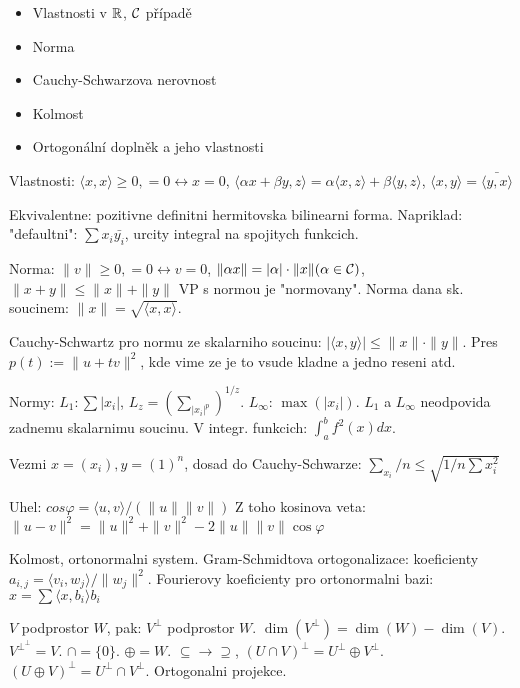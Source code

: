\begin{itemize}
\item Vlastnosti v $\mathbb{R}$, $\mathcal{C}$ případě
\item Norma
\item Cauchy-Schwarzova nerovnost
\item Kolmost
\item Ortogonální doplněk a jeho vlastnosti
\end{itemize}

Vlastnosti: $\langle x,x\rangle\geq 0, =0\leftrightarrow x=0$,
$\langle\alpha x+\beta y,z\rangle=\alpha\langle x,z\rangle+\beta\langle
y,z\rangle$, $\langle x,y\rangle=\bar{\langle y,x\rangle}$

Ekvivalentne: pozitivne definitni hermitovska bilinearni forma.
Napriklad: "defaultni": $\sum x_i\bar{y_i}$, urcity integral na spojitych
funkcich.

Norma: $\|v\|\geq 0,=0\leftrightarrow v=0$, $\|\alpha x\|=|\alpha|\cdot\|x\|
(\alpha\in\mathcal{C})$, $\|x+y\|\leq\|x\|+\|y\|$
VP s normou je "normovany".
Norma dana sk. soucinem: $\|x\|=\sqrt{\langle x,x\rangle}$.

Cauchy-Schwartz pro normu ze skalarniho soucinu:
$|\langle x,y\rangle|\leq\|x\|\cdot\|y\|$.
Pres $p(t):=\|u+tv\|^2$, kde vime ze je to vsude kladne a jedno reseni atd.

Normy: $L_1: \sum|x_i|$, $L_z=(\sum_{|x_i|^p})^{1/z}$.
$L_\infty$: $\max(|x_i|)$. $L_1$ a $L_\infty$ neodpovida
zadnemu skalarnimu soucinu. V integr. funkcich: $\int_a^b f^2(x)dx$.

Vezmi $x=(x_i), y=(1)^n$, dosad do Cauchy-Schwarze: $\sum_{x_i}/n\leq\sqrt{1/n
\sum x_i^2}$

Uhel: $cos\varphi=\langle u,v\rangle/(\|u\|\|v\|)$
Z toho kosinova veta: $\|u-v\|^2=\|u\|^2+\|v\|^2-2\|u\|\|v\|\cos\varphi$

Kolmost, ortonormalni system.
Gram-Schmidtova ortogonalizace: koeficienty $a_{i,j}=\langle
v_i,w_j\rangle/\|w_j\|^2$.
Fourierovy koeficienty pro ortonormalni bazi: $x=\sum\langle x,b_i\rangle b_i$

$V$ podprostor $W$, pak:
$V^\perp$ podprostor $W$.
$\dim(V^\perp)=\dim(W)-\dim(V)$. $V^\perp^\perp=V$.
$\cap=\{0\}$. $\oplus=W$. $\subseteq\rightarrow\supseteq$,
$(U\cap V)^\perp=U^\perp \oplus V^\perp$.
$(U\oplus V)^\perp=U^\perp \cap V^\perp$.
Ortogonalni projekce.
